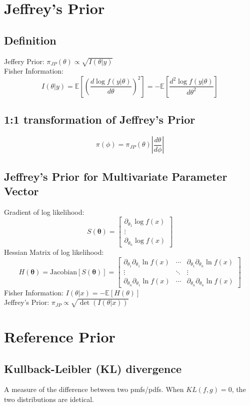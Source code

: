 \documentclass[12pt]{article}
\theoremstyle{definition}
\newcommand{\Expect}[1]{\mathbb{E}\left[#1\right]}
\begin{document}
\section{Jeffrey's Prior}
    \subsection*{Definition}
    Jeffery Prior: $\pi_{JP}(\theta) \propto \sqrt{I(\theta|y)}$
    \\Fisher Information:
    $$I(\theta|y) = \Expect{\left( \frac{d \log f(y|\theta)}{d\theta} \right)^2} = -\Expect{ \frac{d^2 \log f(y|\theta)}{d\theta^2}}$$
    \subsection*{1:1 transformation of Jeffrey's Prior}
    $$\pi(\phi) = \pi_{JP}(\theta)\left| \frac{d \theta}{d \phi}\right|$$
    \subsection*{Jeffrey's Prior for Multivariate Parameter Vector}
    Gradient of log likelihood:
    $$ S(\bm{\theta}) = \begin{bmatrix*}
        \partial_{\theta_1} \log f(x)\\
        \vdots\\
        \partial_{\theta_n} \log f(x)
    \end{bmatrix*}$$
    Hessian Matrix of log likelihood:
    $$H(\bm{\theta}) = \text{Jacobian}\left[S(\bm{\theta})\right] = \begin{bmatrix*}
        \partial_{\theta_1}\partial_{\theta_1} \ln f(x) & \cdots & \partial_{\theta_1}\partial_{\theta_n} \ln f(x)\\
        \vdots & \ddots & \vdots\\
        \partial_{\theta_n}\partial_{\theta_1} \ln f(x) & \cdots & \partial_{\theta_n}\partial_{\theta_n} \ln f(x)
    \end{bmatrix*}$$
    Fisher Information: $I(\theta|x) = -\Expect{H(\theta)}$\\
    Jeffrey's Prior: $\pi_{JP} \propto \sqrt{\det(I(\theta|x))}$

\newpage
\section{Reference Prior}
    \subsection*{Kullback-Leibler  (KL)  divergence}
    A measure of the difference between two pmfs/pdfs. When $KL(f,g) = 0$, the two distributions are idetical.
\end{document}
